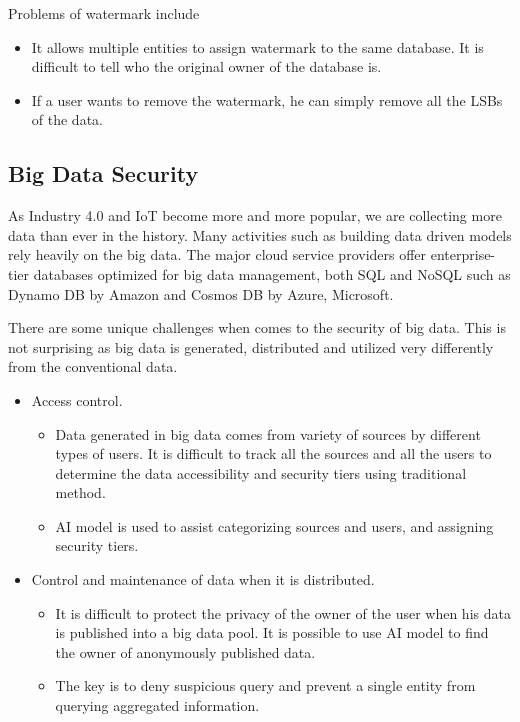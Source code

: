 Problems of watermark include
\begin{itemize}
	\item It allows multiple entities to assign watermark to the same database. It is difficult to tell who the original owner of the database is.
	\item If a user wants to remove the watermark, he can simply remove all the LSBs of the data.
\end{itemize}

\subsection{Big Data Security}

As Industry 4.0 and IoT become more and more popular, we are collecting more data than ever in the history. Many activities such as building data driven models rely heavily on the big data. The major cloud service providers offer enterprise-tier databases optimized for big data management, both SQL and NoSQL such as Dynamo DB by Amazon and Cosmos DB by Azure, Microsoft.

There are some unique challenges when comes to the security of big data. This is not surprising as big data is generated, distributed and utilized very differently from the conventional data.
\begin{itemize}
	\item Access control. 
	\begin{itemize}
		\item Data generated in big data comes from variety of sources by different types of users. It is difficult to track all the sources and all the users to determine the data accessibility and security tiers using traditional method.
		\item AI model is used to assist categorizing sources and users, and assigning security tiers.
	\end{itemize}
	\item Control and maintenance of data when it is distributed.
	\begin{itemize}
		\item It is difficult to protect the privacy of the owner of the user when his data is published into a big data pool. It is possible to use AI model to find the owner of anonymously published data.
		\item The key is to deny suspicious query and prevent a single entity from querying aggregated information.
	\end{itemize}
\end{itemize}

